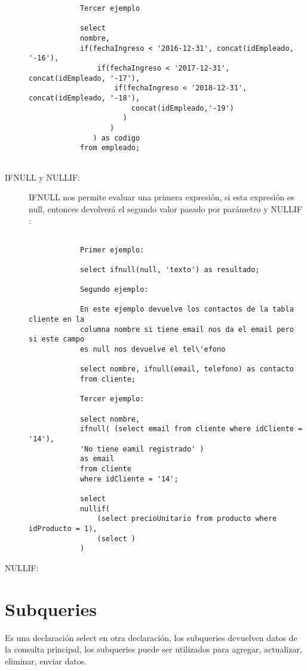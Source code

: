 \begin{description}
\begin{ejemplo}
\begin{verbatim}
			Tercer ejemplo
			
			select
			nombre,
			if(fechaIngreso < '2016-12-31', concat(idEmpleado, '-16'),
				if(fechaIngreso < '2017-12-31', concat(idEmpleado, '-17'),
					if(fechaIngreso < '2018-12-31', concat(idEmpleado, '-18'),
						concat(idEmpleado,'-19')
					  )
				   )
			   ) as codigo
			from empleado;
			 
		\end{verbatim}
	\end{ejemplo}
	\item[IFNULL y NULLIF:] IFNULL nos permite evaluar una primera expresi\'on, si esta expresi\'on es null, entonces devolver\'a el segundo valor pasado por par\'ametro y NULLIF : 
	\begin{ejemplo}
		\begin{verbatim}
			
			Primer ejemplo: 
			
			select ifnull(null, 'texto') as resultado;
			
			Segundo ejemplo: 
			
			En este ejemplo devuelve los contactos de la tabla cliente en la
			columna nombre si tiene email nos da el email pero si este campo
			es null nos devuelve el tel\'efono
			
			select nombre, ifnull(email, telefono) as contacto
			from cliente;
			
			Tercer ejemplo: 
			
			select nombre,
			ifnull( (select email from cliente where idCliente = '14'), 
			'No tiene eamil registrado' )
			as email 
			from cliente
			where idCliente = '14';
			
			select 
			nullif(
				(select precioUnitario from producto where idProducto = 1),
				(select )
			)
		\end{verbatim}
	\end{ejemplo}
	
	\item[NULLIF:]

\end{description}

\section{Subqueries}
Es una declaraci\'on select en otra declaraci\'on, los subqueries devuelven datos de la consulta principal, los subqueries puede ser utilizados para agregar, actualizar, eliminar, enviar datos.

